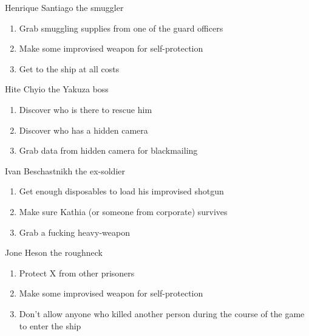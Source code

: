 \begin{rpg-commentbox}{Henrique Santiago the smuggler}
    \begin{enumerate}[label=\textbf{Act \arabic*}, leftmargin=1cm]
        \item Grab smuggling supplies from one of the guard officers
        \item Make some improvised weapon for self-protection
        \item Get to the ship at all costs
    \end{enumerate}
\end{rpg-commentbox}

\begin{rpg-commentbox}{Hite Chyio the Yakuza boss}
    \begin{enumerate}[label=\textbf{Act \arabic*}, leftmargin=1cm]
        \item Discover who is there to rescue him
        \item Discover who has a hidden camera
        \item Grab data from hidden camera for blackmailing
    \end{enumerate}
    
\end{rpg-commentbox}

\begin{rpg-commentbox}{Ivan Beschastnikh the ex-soldier}
    \begin{enumerate}[label=\textbf{Act \arabic*}, leftmargin=1cm]
        \item Get enough disposables to load his improvised shotgun
        \item Make sure Kathia (or someone from corporate) survives
        \item Grab a fucking heavy-weapon
    \end{enumerate}
\end{rpg-commentbox}

\begin{rpg-commentbox}{Jone Heson the roughneck}
    \begin{enumerate}[label=\textbf{Act \arabic*}, leftmargin=1cm]
        \item Protect X from other prisoners
        \item Make some improvised weapon for self-protection
        \item Don't allow anyone who killed another person during the course of the game to enter the ship
    \end{enumerate}
\end{rpg-commentbox}

